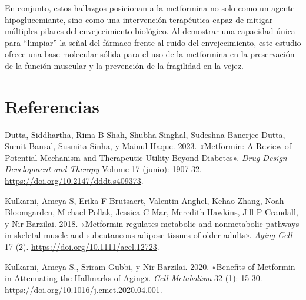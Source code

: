 \documentclass[
  spanish,
  11pt,
]{article}
\newlength{\cslhangindent}
\newenvironment{CSLReferences}[2] %
 {\begin{list}{}{%
  \setlength{\itemindent}{0pt}
  \setlength{\leftmargin}{0pt}
  \setlength{\parsep}{0pt}
  \ifodd #1
   \setlength{\leftmargin}{\cslhangindent}
   \setlength{\itemindent}{-1\cslhangindent}
  \fi
  \setlength{\itemsep}{#2\baselineskip}}}
 {\end{list}}
\begin{document}
En conjunto, estos hallazgos posicionan a la metformina no solo como un
agente hipoglucemiante, sino como una intervención terapéutica capaz de
mitigar múltiples pilares del envejecimiento biológico. Al demostrar una
capacidad única para ``limpiar'' la señal del fármaco frente al ruido
del envejecimiento, este estudio ofrece una base molecular sólida para
el uso de la metformina en la preservación de la función muscular y la
prevención de la fragilidad en la vejez.

\section*{Referencias}\label{referencias}

\label{refs}
\begin{CSLReferences}{1}{0}
Dutta, Siddhartha, Rima B Shah, Shubha Singhal, Sudeshna Banerjee Dutta,
Sumit Bansal, Susmita Sinha, y Mainul Haque. 2023. {«{Metformin: A
Review of Potential Mechanism and Therapeutic Utility Beyond
Diabetes}»}. \emph{Drug Design Development and Therapy} Volume 17
(junio): 1907-32. \url{https://doi.org/10.2147/dddt.s409373}.

Kulkarni, Ameya S, Erika F Brutsaert, Valentin Anghel, Kehao Zhang, Noah
Bloomgarden, Michael Pollak, Jessica C Mar, Meredith Hawkins, Jill P
Crandall, y Nir Barzilai. 2018. {«{Metformin regulates metabolic and
nonmetabolic pathways in skeletal muscle and subcutaneous adipose
tissues of older adults}»}. \emph{Aging Cell} 17 (2).
\url{https://doi.org/10.1111/acel.12723}.

Kulkarni, Ameya S., Sriram Gubbi, y Nir Barzilai. 2020. {«{Benefits of
Metformin in Attenuating the Hallmarks of Aging}»}. \emph{Cell
Metabolism} 32 (1): 15-30.
\url{https://doi.org/10.1016/j.cmet.2020.04.001}.

\end{CSLReferences}
\end{document}
